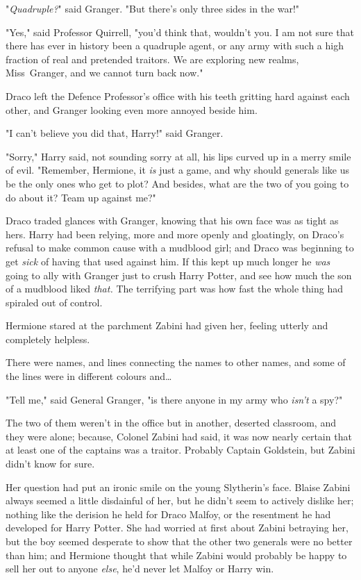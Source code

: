 "\emph{Quadruple?}" said Granger. "But there's only three sides in the war!"

"Yes," said Professor Quirrell, "you'd think that, wouldn't you. I am not sure
that there has ever in history been a quadruple agent, or any army with such a
high fraction of real and pretended traitors. We are exploring new realms,
Miss~Granger, and we cannot turn back now."

Draco left the Defence Professor's office with his teeth gritting hard against
each other, and Granger looking even more annoyed beside him.

"I can't believe you did that, Harry!" said Granger.

"Sorry," Harry said, not sounding sorry at all, his lips curved up in a merry
smile of evil. "Remember, Hermione, it \emph{is} just a game, and why should
generals like us be the only ones who get to plot? And besides, what are the
two of you going to do about it? Team up against me?"

Draco traded glances with Granger, knowing that his own face was as tight as
hers. Harry had been relying, more and more openly and gloatingly, on Draco's
refusal to make common cause with a mudblood girl; and Draco was beginning to
get \emph{sick} of having that used against him. If this kept up much longer he
\emph{was} going to ally with Granger just to crush Harry Potter, and see how
much the son of a mudblood liked \emph{that.}
\later
The terrifying part was how fast the whole thing had spiraled out of control.

Hermione stared at the parchment Zabini had given her, feeling utterly and
completely helpless.

There were names, and lines connecting the names to other names, and some of
the lines were in different colours and…

"Tell me," said General Granger, "is there anyone in my army who \emph{isn't} a
spy?"

The two of them weren't in the office but in another, deserted classroom, and
they were alone; because, Colonel Zabini had said, it was now nearly certain
that at least one of the captains was a traitor. Probably Captain Goldstein,
but Zabini didn't know for sure.

Her question had put an ironic smile on the young Slytherin's face. Blaise
Zabini always seemed a little disdainful of her, but he didn't seem to actively
dislike her; nothing like the derision he held for Draco Malfoy, or the
resentment he had developed for Harry Potter. She had worried at first about
Zabini betraying her, but the boy seemed desperate to show that the other two
generals were no better than him; and Hermione thought that while Zabini would
probably be happy to sell her out to anyone \emph{else}, he'd never let Malfoy
or Harry win.

